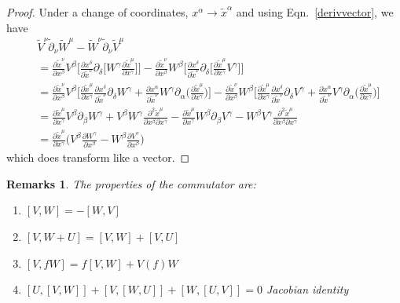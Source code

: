 \documentclass[a4paper]{article}
\newtheorem{remarks}{Remarks}[section]
\theoremstyle{new}
\begin{document}
\begin{proof}
Under a change of coordinates, $x^\alpha\rightarrow\tilde{x}^\alpha$ and using Eqn.~\ref{derivvector}, we have
\begin{align}
    &\tilde{V}^\nu\tilde{\partial}_\nu\tilde{W}^\mu-\tilde{W}^\nu\tilde{\partial}_\nu\tilde{V}^\mu\nonumber\\
    &=\frac{\partial\tilde{x}^\nu}{\partial x^\beta}V^\beta\bigg[\frac{\partial x^\delta}{\partial\tilde{x}^\nu}\partial_\delta\bigg[ W^\gamma\frac{\partial\tilde{x}^\mu}{\partial x^\gamma}\bigg]\bigg]-\frac{\partial\tilde{x}^\nu}{\partial x^\beta}W^\beta\bigg[\frac{\partial x^\delta}{\partial\tilde{x}^\nu}\partial_\delta\bigg[\frac{\partial\tilde{x}^\mu}{\partial x^\gamma} V^\gamma\bigg]\bigg]\nonumber\\
    &=\frac{\partial\tilde{x}^\nu}{\partial x^\beta}V^\beta\bigg[\frac{\partial\tilde{x}^\mu}{\partial x^\gamma}\frac{\partial x^\delta}{\partial\tilde{x}^\nu}\partial_\delta W^\gamma+\frac{\partial x^\alpha}{\partial\tilde{x}^\nu}W^\gamma\partial_\alpha\bigg(\frac{\partial\tilde{x}^\mu}{\partial x^\gamma}\bigg)\bigg]-\frac{\partial\tilde{x}^\nu}{\partial x^\beta}W^\beta\bigg[\frac{\partial\tilde{x}^\mu}{\partial x^\gamma}\frac{\partial x^\delta}{\partial\tilde{x}^\nu}\partial_\delta V^\gamma+\frac{\partial x^\alpha}{\partial\tilde{x}^\nu}V^\gamma\partial_\alpha\bigg(\frac{\partial\tilde{x}^\mu}{\partial x^\gamma}\bigg)\bigg]\nonumber\\&=\frac{\partial\tilde{x}^\mu}{\partial x^\gamma}V^\beta\partial_\beta W^\gamma+V^\beta W^\gamma\frac{\partial^2\tilde{x}^\mu}{\partial x^\beta\partial x^\gamma}-\frac{\partial\tilde{x}^\mu}{\partial x^\gamma}W^\beta\partial_\beta V^\gamma-W^\beta V^\gamma\frac{\partial^2\tilde{x}^\mu}{\partial x^\beta\partial x^\gamma}\nonumber\\&=\frac{\partial\tilde{x}^\mu}{\partial x^\gamma}\bigg(V^\beta\frac{\partial W^\gamma}{\partial x^\beta}-W^\beta\frac{\partial V^\gamma}{\partial x^\beta}\bigg)\nonumber
\end{align}
which does transform like a vector.
\end{proof}
\begin{remarks}
The properties of the commutator are:
\begin{enumerate}
    \item $[V,W]=-[W,V]$
    \item $[V,W+U]=[V,W]+[V,U]$
    \item $[V,fW]=f[V,W]+V(f)W$
    \item $[U,[V,W]]+[V,[W,U]]+[W,[U,V]]=0$ Jacobian identity
\end{enumerate}
\end{remarks}
\end{document}
